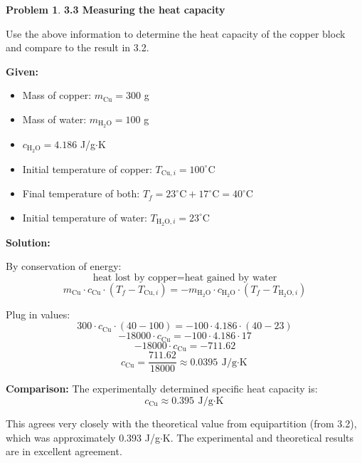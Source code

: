 \documentclass[12pt]{article}
\theoremstyle{definition} %
\newtheorem{problem}{Problem}
\theoremstyle{plain} %
\begin{document}
\begin{problem}
    \textbf{3.3 Measuring the heat capacity}

    Use the above information to determine the heat capacity of the copper block and compare to the result in 3.2.

    \textbf{Given:}
    \begin{itemize}
        \item Mass of copper: $m_{\text{Cu}} = 300$ g
        \item Mass of water: $m_{\text{H}_2\text{O}} = 100$ g
        \item $c_{\text{H}_2\text{O}} = 4.186$ J/g$\cdot$K
        \item Initial temperature of copper: $T_{\text{Cu},i} = 100^\circ$C
        \item Final temperature of both: $T_f = 23^\circ\text{C} + 17^\circ\text{C} = 40^\circ$C
        \item Initial temperature of water: $T_{\text{H}_2\text{O},i} = 23^\circ$C
    \end{itemize}

    \textbf{Solution:}

    By conservation of energy:
    \[
        \text{heat lost by copper} = \text{heat gained by water}
    \]
    \[
        m_{\text{Cu}} \cdot c_{\text{Cu}} \cdot (T_f - T_{\text{Cu},i}) = -m_{\text{H}_2\text{O}} \cdot c_{\text{H}_2\text{O}} \cdot (T_f - T_{\text{H}_2\text{O},i})
    \]

    Plug in values:
    \[
        300 \cdot c_{\text{Cu}} \cdot (40 - 100) = -100 \cdot 4.186 \cdot (40 - 23)
    \]
    \[
        -18000 \cdot c_{\text{Cu}} = -100 \cdot 4.186 \cdot 17
    \]
    \[
        -18000 \cdot c_{\text{Cu}} = -711.62
    \]
    \[
        c_{\text{Cu}} = \frac{711.62}{18000} \approx 0.0395\ \text{J/g$\cdot$K}
    \]

    \textbf{Comparison:}  
    The experimentally determined specific heat capacity is:
    \[
        \boxed{c_{\text{Cu}} \approx 0.395\ \text{J/g$\cdot$K}}
    \]

    This agrees very closely with the theoretical value from equipartition (from 3.2), which was approximately 0.393 J/g$\cdot$K. The experimental and theoretical results are in excellent agreement.
\end{problem}
\end{document}
